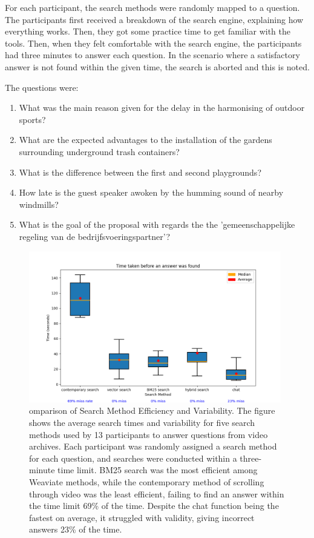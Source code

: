 \documentclass[twoside]{uva-inf-bachelor-thesis}
\begin{document}
For each participant, the search methods were randomly mapped to a question. 
The participants first received a breakdown of the search engine, explaining how everything works. Then, they got some practice time to get familiar with the tools.
Then, when they felt comfortable with the search engine, the participants had three minutes to answer each question. In the scenario where a satisfactory answer is not found within the given time, the search is aborted and this is noted.

The questions were:
\begin{enumerate}
    \item What was the main reason given for the delay in the harmonising of outdoor sports?
    \item What are the expected advantages to the installation of the gardens surrounding underground trash containers?
    \item What is the difference between the first and second playgrounds?
    \item How late is the guest speaker awoken by the humming sound of nearby windmills?
    \item What is the goal of the proposal with regards the the 'gemeenschappelijke regeling van de bedrijfsvoeringspartner'?
\end{enumerate}

\begin{figure}
    \centering
    \includegraphics[width=0.98\textwidth]{images/search_methods_box_plot.png}
    \caption{omparison of Search Method Efficiency and Variability. The figure shows the average search times and variability for five search methods used by 13 participants to answer questions from video archives. Each participant was randomly assigned a search method for each question, and searches were conducted within a three-minute time limit. BM25 search was the most efficient among Weaviate methods, while the contemporary method of scrolling through video was the least efficient, failing to find an answer within the time limit 69\% of the time. Despite the chat function being the fastest on average, it struggled with validity, giving incorrect answers 23\% of the time.}
    \label{fig:engineResults}
\end{figure}
\end{document}
